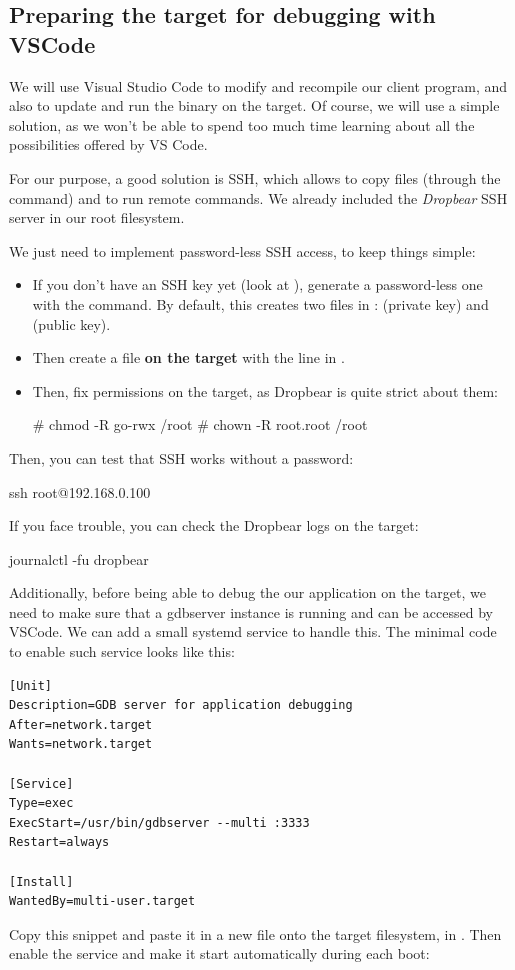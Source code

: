 \subsection{Preparing the target for debugging with VSCode}

We will use Visual Studio Code to modify and recompile our client
program, and also to update and run the binary on the target.
Of course, we will use a simple solution, as we won't be able to
spend too much time learning about all the possibilities offered
by VS Code.

For our purpose, a good solution is SSH, which allows to copy files
(through the  command) and to run remote commands. We already
included the {\em Dropbear} SSH server in our root filesystem.

We just need to implement password-less SSH access, to keep things
simple:

\begin{itemize}
  \item If you don't have an SSH key yet (look at ),
	generate a password-less one with the  command.
	By default, this creates two files in :
	 (private key) and  (public key).
  \item Then create a  file {\bf on the target}
        with the line in .
  \item Then, fix permissions on the target, as Dropbear is quite strict
        about them:
        \begin{bashinput}
# chmod -R go-rwx /root
# chown -R root.root /root
        \end{bashinput}
\end{itemize}

Then, you can test that SSH works without a password:

\begin{bashinput}
ssh root@192.168.0.100
\end{bashinput}

If you face trouble, you can check the Dropbear logs on the target:

\begin{bashinput}
journalctl -fu dropbear
\end{bashinput}

Additionally, before being able to debug the our application on the target, we
need to make sure that a gdbserver instance is running and can be accessed
by VSCode. We can add a small systemd service to handle this. The minimal
code to enable such service looks like this:
\begin{verbatim}
[Unit]
Description=GDB server for application debugging
After=network.target
Wants=network.target

[Service]
Type=exec
ExecStart=/usr/bin/gdbserver --multi :3333
Restart=always

[Install]
WantedBy=multi-user.target
\end{verbatim}
Copy this snippet and paste it in a new  file onto
the target filesystem, in . Then enable the
service and make it start automatically during each boot:


